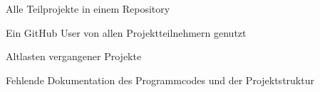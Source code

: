 \begin{frame}
\begin{block}{}
	Alle Teilprojekte in einem Repository
\end{block}
\begin{block}{}
	Ein GitHub User von allen Projektteilnehmern genutzt
\end{block}
\begin{block}{}
	Altlasten vergangener Projekte
\end{block}
\begin{block}{}
	Fehlende Dokumentation des Programmcodes und der Projektstruktur
\end{block}
\end{frame}